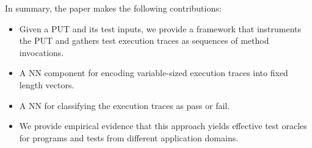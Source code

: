 \noindent In summary, the paper makes the following contributions:
\begin{itemize}[itemsep = 0pt, topsep = 0pt, partopsep=0pt]
\item Given a PUT and its test inputs, we provide a framework that instruments the PUT and gathers test execution traces as sequences of method invocations. 
\item A NN component for encoding variable-sized execution traces into fixed length vectors.
\item A NN for classifying the execution traces as pass or fail.  
\item We provide empirical evidence that this approach yields effective test oracles for programs and tests from different application domains. 
\end{itemize}
\vspace{-5pt}



